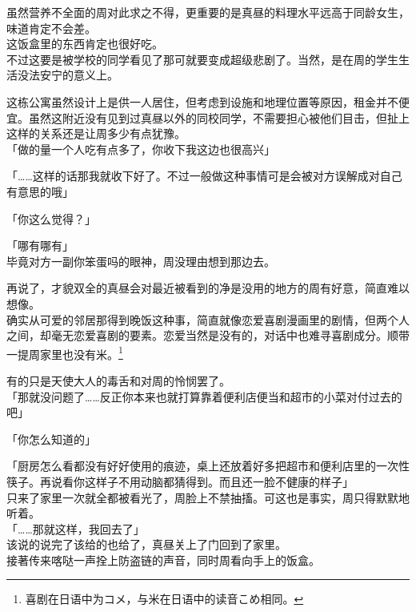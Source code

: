 虽然营养不全面的周对此求之不得，更重要的是真昼的料理水平远高于同龄女生，味道肯定不会差。\\

这饭盒里的东西肯定也很好吃。\\

不过这要是被学校的同学看见了那可就要变成超级悲剧了。当然，是在周的学生生活没法安宁的意义上。

这栋公寓虽然设计上是供一人居住，但考虑到设施和地理位置等原因，租金并不便宜。虽然这附近没有见到过真昼以外的同校同学，不需要担心被他们目击，但扯上这样的关系还是让周多少有点犹豫。\\

「做的量一个人吃有点多了，你收下我这边也很高兴」

「……这样的话那我就收下好了。不过一般做这种事情可是会被对方误解成对自己有意思的哦」

「你这么觉得？」

「哪有哪有」\\

毕竟对方一副你笨蛋吗的眼神，周没理由想到那边去。

再说了，才貌双全的真昼会对最近被看到的净是没用的地方的周有好意，简直难以想像。\\

确实从可爱的邻居那得到晚饭这种事，简直就像恋爱喜剧漫画里的剧情，但两个人之间，却毫无恋爱喜剧的要素。恋爱当然是没有的，对话中也难寻喜剧成分。顺带一提周家里也没有米。\footnote{喜剧在日语中为{\jpfont コメ}，与米在日语中的读音{\jpfont こめ}相同。}

有的只是天使大人的毒舌和对周的怜悯罢了。\\

「那就没问题了……反正你本来也就打算靠着便利店便当和超市的小菜对付过去的吧」

「你怎么知道的」

「厨房怎么看都没有好好使用的痕迹，桌上还放着好多把超市和便利店里的一次性筷子。再说看你这样子不用动脑都猜得到。而且还一脸不健康的样子」\\

只来了家里一次就全都被看光了，周脸上不禁抽搐。可这也是事实，周只得默默地听着。\\

「……那就这样，我回去了」\\

该说的说完了该给的也给了，真昼关上了门回到了家里。\\

接著传来喀哒一声拴上防盗链的声音，同时周看向手上的饭盒。

